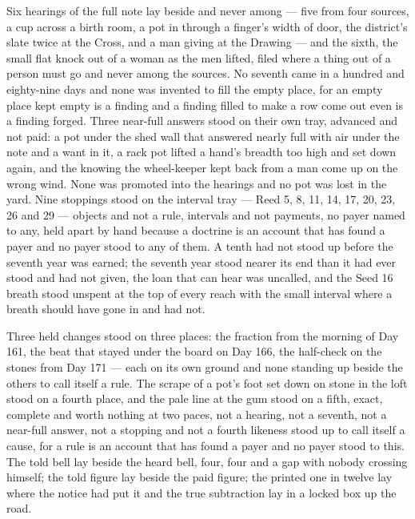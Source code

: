Six hearings of the full note lay beside and never among --- five from four sources, a cup across a birth room, a pot in  through a finger's width of door, the district's slate twice at the Cross, and a man giving at the Drawing --- and the sixth, the small flat knock out of a woman as the men lifted, filed where a thing out of a person must go and never among the sources. No seventh came in a hundred and eighty-nine days and none was invented to fill the empty place, for an empty place kept empty is a finding and a finding filled to make a row come out even is a finding forged. Three near-full answers stood on their own tray, advanced and not paid: a pot under the shed wall that answered nearly full with air under the note and a want in it, a rack pot lifted a hand's breadth too high and set down again, and the knowing the wheel-keeper kept back from a man come up on the wrong wind. None was promoted into the hearings and no pot was lost in the yard. Nine stoppings stood on the interval tray --- Reed 5, 8, 11, 14, 17, 20, 23, 26 and 29 --- objects and not a rule, intervals and not payments, no payer named to any, held apart by hand because a doctrine is an account that has found a payer and no payer stood to any of them. A tenth had not stood up before the seventh year was earned; the seventh year stood nearer its end than it had ever stood and had not given, the loan that can hear was uncalled, and the Seed 16 breath stood unspent at the top of every reach with the small interval where a breath should have gone in and had not.

Three held changes stood on three places: the fraction from the morning of Day 161, the beat that stayed under the board on Day 166, the half-check on the stones from Day 171 --- each on its own ground and none standing up beside the others to call itself a rule. The scrape of a pot's foot set down on stone in the loft stood on a fourth place, and the pale line at the gum stood on a fifth, exact, complete and worth nothing at two paces, not a hearing, not a seventh, not a near-full answer, not a stopping and not a fourth likeness stood up to call itself a cause, for a rule is an account that has found a payer and no payer stood to this. The told bell lay beside the heard bell, four, four and a gap with nobody crossing himself; the told figure lay beside the paid figure; the printed one in twelve lay where the notice had put it and the true subtraction lay in a locked box up the road.

